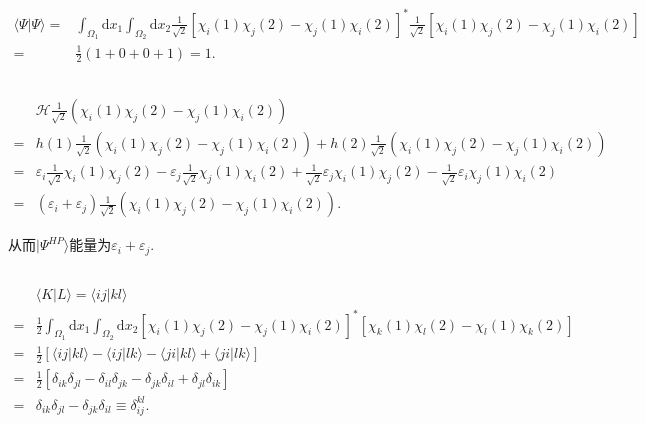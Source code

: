 \documentclass[UTF8]{ctexart}
\newcommand\diff[1]{\mathrm{d}#1}
\begin{document}
	\subsection{}
		\[
		\begin{aligned}
			\langle \Psi | \Psi \rangle =& \int_{\Omega_1} \diff x_1 \int_{\Omega_2} \diff x_2 \frac{1}{\sqrt{2}} [ \chi _i(1) \chi _j(2) - \chi _j(1) \chi _i(2) ]^* \frac{1}{\sqrt{2}} [ \chi _i(1) \chi _j(2) - \chi _j(1) \chi _i(2) ] \\
			=& \frac{1}{2}(1+0+0+1) = 1.
		\end{aligned}
		\]
	
	\subsection{}
		\[
		\begin{aligned}
			&\mathscr{H} \frac{1}{\sqrt{2}} ( \chi _i(1) \chi _j(2) - \chi _j(1) \chi _i(2) ) \\
			=& h(1)\frac{1}{\sqrt{2}} ( \chi _i(1) \chi _j(2) - \chi _j(1) \chi _i(2) ) + h(2)\frac{1}{\sqrt{2}} ( \chi _i(1) \chi _j(2) - \chi _j(1) \chi _i(2) ) \\
			=& \varepsilon_i \frac{1}{\sqrt{2}} \chi _i(1) \chi _j(2) - \varepsilon_j \frac{1}{\sqrt{2}} \chi _j(1) \chi _i(2) + \frac{1}{\sqrt{2}} \varepsilon_j \chi _i(1) \chi _j(2) - \frac{1}{\sqrt{2}} \varepsilon_i \chi _j(1) \chi _i(2) \\
			=& ( \varepsilon_i + \varepsilon_j ) \frac{1}{\sqrt{2}} ( \chi _i(1) \chi _j(2) - \chi _j(1) \chi _i(2) ).
		\end{aligned}
		\]
	
		从而$|\Psi^{HP}\rangle$能量为$\varepsilon_i + \varepsilon_j$.
	
	\subsection{}
		\[
		\begin{aligned}
			&\langle K | L \rangle = \langle ij | kl \rangle \\
			=& \frac{1}{2} \int_{\Omega_1} \diff x_1 \int_{\Omega_2} \diff x_2 [ \chi _i(1) \chi _j(2) - \chi _j(1) \chi _i(2) ]^* [ \chi _k(1) \chi _l(2) - \chi _l(1) \chi _k(2) ] \\
			=& \frac{1}{2} [ \langle ij | kl \rangle - \langle ij | lk \rangle - \langle ji | kl \rangle + \langle ji | lk \rangle ] \\
			=& \frac{1}{2} [ \delta_{ik}\delta_{jl} - \delta_{il}\delta_{jk} - \delta_{jk}\delta_{il} + \delta_{jl}\delta_{ik} ] \\
			=& \delta_{ik}\delta_{jl} - \delta_{jk}\delta_{il} \equiv \delta_{ij}^{kl}.
		\end{aligned}
		\]
		
\end{document}
